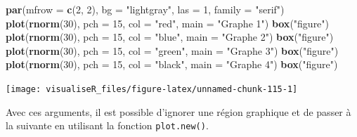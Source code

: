 \documentclass[]{article}
\newenvironment{Shaded}{\begin{snugshade}}{\end{snugshade}}
\newcommand{\DataTypeTok}[1]{\textcolor[rgb]{0.13,0.29,0.53}{#1}}
\newcommand{\DecValTok}[1]{\textcolor[rgb]{0.00,0.00,0.81}{#1}}
\newcommand{\KeywordTok}[1]{\textcolor[rgb]{0.13,0.29,0.53}{\textbf{#1}}}
\newcommand{\NormalTok}[1]{#1}
\newcommand{\StringTok}[1]{\textcolor[rgb]{0.31,0.60,0.02}{#1}}
\begin{document}
\begin{Shaded}
\begin{Highlighting}[]
\KeywordTok{par}\NormalTok{(}\DataTypeTok{mfrow =} \KeywordTok{c}\NormalTok{(}\DecValTok{2}\NormalTok{, }\DecValTok{2}\NormalTok{), }\DataTypeTok{bg =} \StringTok{"lightgray"}\NormalTok{, }\DataTypeTok{las =} \DecValTok{1}\NormalTok{, }\DataTypeTok{family =} \StringTok{"serif"}\NormalTok{)}
\KeywordTok{plot}\NormalTok{(}\KeywordTok{rnorm}\NormalTok{(}\DecValTok{30}\NormalTok{), }\DataTypeTok{pch =} \DecValTok{15}\NormalTok{, }\DataTypeTok{col =} \StringTok{"red"}\NormalTok{, }\DataTypeTok{main =} \StringTok{"Graphe 1"}\NormalTok{)}
\KeywordTok{box}\NormalTok{(}\StringTok{"figure"}\NormalTok{)}
\KeywordTok{plot}\NormalTok{(}\KeywordTok{rnorm}\NormalTok{(}\DecValTok{30}\NormalTok{), }\DataTypeTok{pch =} \DecValTok{15}\NormalTok{, }\DataTypeTok{col =} \StringTok{"blue"}\NormalTok{, }\DataTypeTok{main =} \StringTok{"Graphe 2"}\NormalTok{)}
\KeywordTok{box}\NormalTok{(}\StringTok{"figure"}\NormalTok{)}
\KeywordTok{plot}\NormalTok{(}\KeywordTok{rnorm}\NormalTok{(}\DecValTok{30}\NormalTok{), }\DataTypeTok{pch =} \DecValTok{15}\NormalTok{, }\DataTypeTok{col =} \StringTok{"green"}\NormalTok{, }\DataTypeTok{main =} \StringTok{"Graphe 3"}\NormalTok{)}
\KeywordTok{box}\NormalTok{(}\StringTok{"figure"}\NormalTok{)}
\KeywordTok{plot}\NormalTok{(}\KeywordTok{rnorm}\NormalTok{(}\DecValTok{30}\NormalTok{), }\DataTypeTok{pch =} \DecValTok{15}\NormalTok{, }\DataTypeTok{col =} \StringTok{"black"}\NormalTok{, }\DataTypeTok{main =} \StringTok{"Graphe 4"}\NormalTok{)}
\KeywordTok{box}\NormalTok{(}\StringTok{"figure"}\NormalTok{)}
\end{Highlighting}
\end{Shaded}

\begin{center}\texttt{[image: visualiseR\_files/figure-latex/unnamed-chunk-115-1]} \end{center}

Avec ces arguments, il est possible d'ignorer une région graphique et de passer à la suivante en utilisant la fonction \texttt{plot.new()}.
\end{document}
